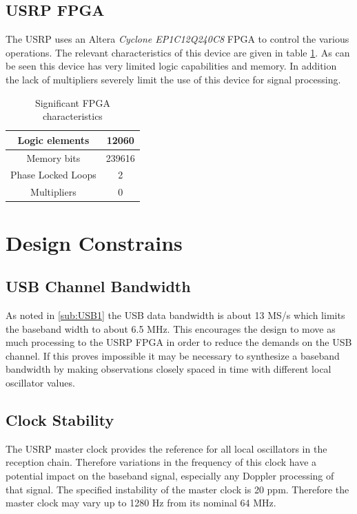 \documentclass[a4paper]{report}
\numberwithin{equation}{chapter}
\begin{document}
\subsection[USRP FPGA]{USRP FPGA}
\label{sub:FPGA1}
The USRP uses an Altera \textit{Cyclone EP1C12Q240C8} FPGA to control the various operations. The relevant characteristics of this device are given in table \ref{tab:01}. As can be seen this device has very limited logic capabilities and memory. In addition the lack of multipliers severely limit the use of this device for signal processing.

\begin{table}
\begin{center}
\begin{tabular}{|c|c|}
\hline
Logic elements & 12060 \\ \hline
Memory bits & 239616 \\ \hline
Phase Locked Loops & 2 \\ \hline
Multipliers & 0 \\ \hline
\end{tabular}
\caption{Significant FPGA characteristics}
\label{tab:01}
\end{center}
\end{table}

\section[Design Constrains]{Design Constrains}
\subsection[USB Channel Bandwidth]{USB Channel Bandwidth}
As noted in \ref{sub:USB1} the USB data bandwidth is about 13 MS/s which limits the baseband width to about 6.5 MHz. This encourages the design to move as much processing to the USRP FPGA in order to reduce the demands on the USB channel. If this proves impossible it may be necessary to synthesize a baseband bandwidth by making observations closely spaced in time with different local oscillator values.

\subsection[Clock Stability]{Clock Stability}

The USRP master clock provides the reference for all local oscillators in the reception chain. Therefore variations in the frequency of this clock have a potential impact on the baseband signal, especially any Doppler processing of that signal. The specified instability of the master clock is 20 ppm. Therefore the master clock may vary up to 1280 Hz from its nominal 64 MHz.
\end{document}
